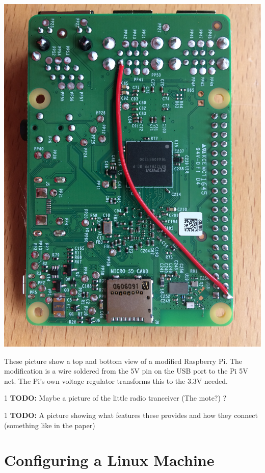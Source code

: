 \documentclass[12pt]{article} %
\def\printtodos{0}
\newcommand{\todo}[1]{
  \if\printtodos1
      {\color{red} \textbf{TODO:} #1}
  \fi}
\begin{document}
\begin{minipage}{0.33\textwidth}
  \noindent \includegraphics[width=\textwidth]{./photos/Pi2.JPG}
\end{minipage}
\begin{minipage}{0.66\textwidth} %
  These picture show a top and bottom view of a modified Raspberry
  Pi. The modification is a wire soldered from the 5V pin on the USB
  port to the Pi 5V net. The Pi's own voltage regulator transforms
  this to the 3.3V needed.
\end{minipage}

\todo{Maybe a picture of the little radio tranceiver (The mote?) ?}

\todo{A picture showing what features these provides and how they
  connect (something like in the paper)}


\section{Configuring a Linux Machine}
\end{document}
